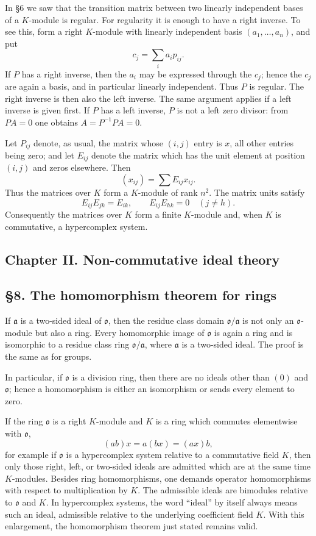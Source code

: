 \documentclass[11pt]{article}
\begin{document}
In §6 we saw that the transition matrix between two linearly independent
bases of a \(K\)-module is regular. For regularity it is enough to have
a right inverse. To see this, form a right \(K\)-module with linearly
independent basis \((a_1,\ldots,a_n)\), and put \[
  c_j=\sum_i a_i p_{ij}.
\] If \(P\) has a right inverse, then the \(a_i\) may be expressed
through the \(c_j\); hence the \(c_j\) are again a basis, and in
particular linearly independent. Thus \(P\) is regular. The right
inverse is then also the left inverse. The same argument applies if a
left inverse is given first. If \(P\) has a left inverse, \(P\) is not a
left zero divisor: from \(PA=0\) one obtains \(A=P^{-1}PA=0\).

Let \(P_{ij}\) denote, as usual, the matrix whose \((i,j)\) entry is
\(x\), all other entries being zero; and let \(E_{ij}\) denote the
matrix which has the unit element at position \((i,j)\) and zeros
elsewhere. Then \[
  (x_{ij})=\sum E_{ij}x_{ij}.
\] Thus the matrices over \(K\) form a \(K\)-module of rank \(n^2\). The
matrix units satisfy \[
  E_{ij}E_{jk}=E_{ik},
  \qquad
  E_{ij}E_{hk}=0\quad (j\ne h).
\] Consequently the matrices over \(K\) form a finite \(K\)-module and,
when \(K\) is commutative, a hypercomplex system.

\subsection{Chapter II. Non-commutative ideal
theory}\label{chapter-ii.-non-commutative-ideal-theory}

\subsection{§8. The homomorphism theorem for
rings}\label{the-homomorphism-theorem-for-rings}

If \(\mathfrak a\) is a two-sided ideal of \(\mathfrak{o}\), then the
residue class domain \(\mathfrak{o}/\mathfrak a\) is not only an
\(\mathfrak{o}\)-module but also a ring. Every homomorphic image of
\(\mathfrak{o}\) is again a ring and is isomorphic to a residue class
ring \(\mathfrak{o}/\mathfrak a\), where \(\mathfrak a\) is a two-sided
ideal. The proof is the same as for groups.

In particular, if \(\mathfrak{o}\) is a division ring, then there are no
ideals other than \((0)\) and \(\mathfrak{o}\); hence a homomorphism is
either an isomorphism or sends every element to zero.

If the ring \(\mathfrak{o}\) is a right \(K\)-module and \(K\) is a ring
which commutes elementwise with \(\mathfrak{o}\), \[
  (ab)x=a(bx)=(ax)b,
\] for example if \(\mathfrak{o}\) is a hypercomplex system relative to
a commutative field \(K\), then only those right, left, or two-sided
ideals are admitted which are at the same time \(K\)-modules. Besides
ring homomorphisms, one demands operator homomorphisms with respect to
multiplication by \(K\). The admissible ideals are bimodules relative to
\(\mathfrak{o}\) and \(K\). In hypercomplex systems, the word ``ideal''
by itself always means such an ideal, admissible relative to the
underlying coefficient field \(K\). With this enlargement, the
homomorphism theorem just stated remains valid.
\end{document}
